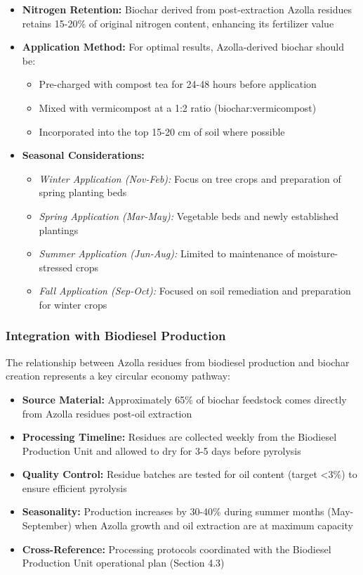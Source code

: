 \begin{itemize}
    \item \textbf{Nitrogen Retention:} Biochar derived from post-extraction Azolla residues retains 15-20\% of original nitrogen content, enhancing its fertilizer value
    \item \textbf{Application Method:} For optimal results, Azolla-derived biochar should be:
    \begin{itemize}
        \item Pre-charged with compost tea for 24-48 hours before application
        \item Mixed with vermicompost at a 1:2 ratio (biochar:vermicompost)
        \item Incorporated into the top 15-20 cm of soil where possible
    \end{itemize}
    \item \textbf{Seasonal Considerations:}
    \begin{itemize}
        \item \textit{Winter Application (Nov-Feb):} Focus on tree crops and preparation of spring planting beds
        \item \textit{Spring Application (Mar-May):} Vegetable beds and newly established plantings
        \item \textit{Summer Application (Jun-Aug):} Limited to maintenance of moisture-stressed crops
        \item \textit{Fall Application (Sep-Oct):} Focused on soil remediation and preparation for winter crops
    \end{itemize}
\end{itemize}

\subsubsection{Integration with Biodiesel Production}\label{sec:biodiesel_integration}

The relationship between Azolla residues from biodiesel production and biochar creation represents a key circular economy pathway:

\begin{itemize}
    \item \textbf{Source Material:} Approximately 65\% of biochar feedstock comes directly from Azolla residues post-oil extraction
    \item \textbf{Processing Timeline:} Residues are collected weekly from the Biodiesel Production Unit and allowed to dry for 3-5 days before pyrolysis
    \item \textbf{Quality Control:} Residue batches are tested for oil content (target <3\%) to ensure efficient pyrolysis
    \item \textbf{Seasonality:} Production increases by 30-40\% during summer months (May-September) when Azolla growth and oil extraction are at maximum capacity
    \item \textbf{Cross-Reference:} Processing protocols coordinated with the Biodiesel Production Unit operational plan (Section 4.3)
\end{itemize}

